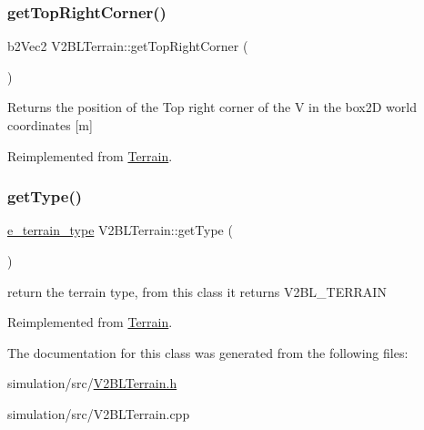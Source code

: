 \subsubsection{\texorpdfstring{get\+Top\+Right\+Corner()}{getTopRightCorner()}}
{\footnotesize\ttfamily b2\+Vec2 V2\+B\+L\+Terrain\+::get\+Top\+Right\+Corner (\begin{DoxyParamCaption}{ }\end{DoxyParamCaption})\hspace{0.3cm}{\ttfamily [virtual]}}

\begin{DoxyReturn}{Returns}
the position of the Top right corner of the V in the box2D world coordinates \mbox{[}m\mbox{]} 
\end{DoxyReturn}


Reimplemented from \mbox{\hyperlink{class_terrain_a10fcf414cba83e769d99156fe16aa795}{Terrain}}.

\mbox{\label{class_v2_b_l_terrain_a4ac0574a992aadd7cfcad6eba6b55000}} 
\subsubsection{\texorpdfstring{get\+Type()}{getType()}}
{\footnotesize\ttfamily \mbox{\hyperlink{_terrain_8h_a6d0b7e83bb7325270c1162bece970fd8}{e\+\_\+terrain\+\_\+type}} V2\+B\+L\+Terrain\+::get\+Type (\begin{DoxyParamCaption}{ }\end{DoxyParamCaption})\hspace{0.3cm}{\ttfamily [virtual]}}

return the terrain type, from this class it returns V2\+B\+L\+\_\+\+T\+E\+R\+R\+A\+IN 

Reimplemented from \mbox{\hyperlink{class_terrain_a6cd1220b8e64466cc7a2219efff4141b}{Terrain}}.



The documentation for this class was generated from the following files\+:\begin{DoxyCompactItemize}
\item 
simulation/src/\mbox{\hyperlink{_v2_b_l_terrain_8h}{V2\+B\+L\+Terrain.\+h}}\item 
simulation/src/V2\+B\+L\+Terrain.\+cpp\end{DoxyCompactItemize}
